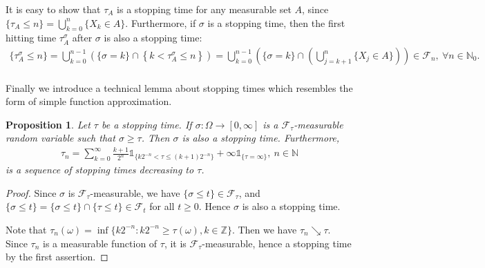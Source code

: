 \documentclass{article}
\numberwithin{equation}{section}
\theoremstyle{plain}
\newtheorem{proposition}[theorem]{Proposition}
\theoremstyle{definition}
\begin{document}
It is easy to show that $\tau_A$ is a stopping time for any measurable set $A$, since $\{\tau_A\leq n\}=\bigcup_{k=0}^n\{X_k\in A\}$. Furthermore, if $\sigma$ is a stopping time, then the first hitting time $\tau_A^\sigma$ after $\sigma$ is also a stopping time:
\begin{align*}
	\{\tau_A^\sigma\leq n\}=\bigcup_{k=0}^{n-1}\left(\{\sigma=k\}\cap\left\{k<\tau_A^\sigma\leq n\right\}\right) = \bigcup_{k=0}^{n-1}\left(\{\sigma=k\}\cap\left(\bigcup_{j=k+1}^n\{X_j\in A\}\right)\right)\in\mathscr{F}_n,\ \forall n\in\mathbb{N}_0.
\end{align*}

\paragraph{} Finally we introduce a technical lemma about stopping times which resembles the form of simple function approximation.
\begin{proposition}\label{prop:3.14} Let $\tau$ be a stopping time. If $\sigma:\Omega\to[0,\infty]$ is a $\mathscr{F}_\tau$-measurable random variable such that $\sigma\geq\tau$. Then $\sigma$ is also a stopping time. Furthermore, 
\begin{align*}
	\tau_n = \sum_{k=0}^\infty\frac{k+1}{2^n}\mathds{1}_{\{k2^{-n}<\tau\leq(k+1)2^{-n}\}}+\infty\mathds{1}_{\{\tau =\infty\}},\ n\in\mathbb{N}
\end{align*}
is a sequence of stopping times decreasing to $\tau$.
\end{proposition}
\begin{proof}
Since $\sigma$ is $\mathscr{F}_\tau$-measurable, we have $\{\sigma\leq t\}\in\mathscr{F}_\tau$, and $\{\sigma\leq t\}=\{\sigma\leq t\}\cap\{\tau\leq t\}\in\mathscr{F}_t$ for all $t\geq 0$. Hence $\sigma$ is also a stopping time. 

Note that $\tau_n(\omega)=\inf\{k2^{-n}:k2^{-n}\geq\tau(\omega),k\in\mathbb{Z}\}$. Then we have $\tau_n\searrow\tau$. Since $\tau_n$ is a measurable function of $\tau$, it is $\mathscr{F}_\tau$-measurable, hence a stopping time by the first assertion.
\end{proof}

\newpage
\end{document}
